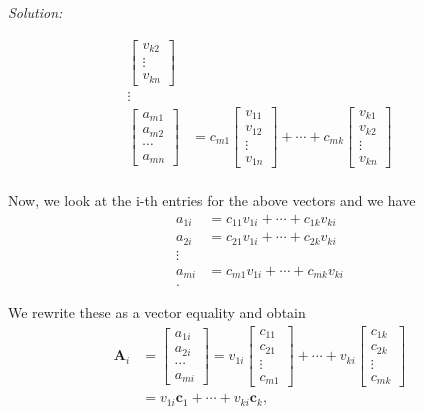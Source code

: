 \documentclass[fleqn]{article}
\newenvironment{solution}
    {\textit{Solution:}}
    {}
\begin{document}
\begin{solution}
\begin{enumerate}[label=(\alph*)]
\begin{align*}
\begin{bmatrix}
       v_{k2} \\ 
        \vdots \\ 
       v_{kn} 
       \end{bmatrix}\\ 
       \vdots\\ 
    \begin{bmatrix} 
      a_{m1} \\ 
       a_{m2} \\ 
        \cdots \\ 
       a_{mn} 
       \end{bmatrix} &=c_{m1}\begin{bmatrix} 
      v_{11} \\ 
       v_{12} \\ 
        \vdots \\ 
       v_{1n} 
       \end{bmatrix}+\cdots+c_{mk}\begin{bmatrix} 
      v_{k1} \\ 
       v_{k2} \\ 
        \vdots \\ 
       v_{kn} 
       \end{bmatrix}\\ 
    \end{align*}
    
    Now, we look at the i-th entries for the above vectors and we have
    \begin{align*} 
    a_{1i}&=c_{11}v_{1i}+\cdots+c_{1k}v_{ki}\\ 
    a_{2i}&=c_{21}v_{1i}+\cdots+c_{2k}v_{ki}\\ 
    \vdots \\ 
    a_{mi}&=c_{m1}v_{1i}+\cdots+c_{mk}v_{ki}\\. 
    \end{align*}
    
    We rewrite these as a vector equality and obtain
    \begin{align*} 
    \mathbf{A}_i&=\begin{bmatrix} 
      a_{1i} \\ 
       a_{2i} \\ 
        \cdots \\ 
       a_{mi} 
       \end{bmatrix}=v_{1i}\begin{bmatrix} 
      c_{11} \\ 
       c_{21} \\ 
        \vdots \\ 
       c_{m1} 
       \end{bmatrix}+\cdots +v_{ki}\begin{bmatrix} 
      c_{1k} \\ 
       c_{2k} \\ 
        \vdots \\ 
       c_{mk} 
       \end{bmatrix}\\ 
       &=v_{1i}\mathbf{c}_{1}+\cdots+v_{ki}\mathbf{c}_k, 
    \end{align*}
    

\end{enumerate}
\end{solution}
\end{document}
